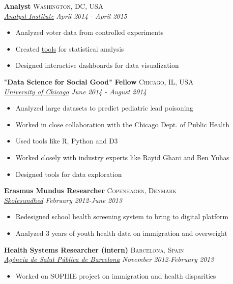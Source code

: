 \documentclass[11pt]{article}
\begin{document}
{\noindent \textbf{Analyst} \hfill \textsc{Washington, DC, USA}\\
\noindent \emph{\href{https://analystinstitute.org/}{Analyst Institute}} \hfill \emph{April 2014 - April 2015}
\vspace{-2mm}
\begin{itemize}\itemsep0pt \parskip0pt 
\item Analyzed voter data from controlled experiments
\item Created \href{https://analystinstitute.org/power-calculator/}{tools} for statistical analysis 
\item Designed interactive dashboards for data visualization
\end{itemize}


\noindent \textbf{"Data Science for Social Good" Fellow} \hfill \textsc{Chicago, IL, USA}\\
\noindent \emph{\href{http://www.uchicago.edu/}{University of Chicago}} \hfill \emph{June 2014 - August 2014}
\vspace{-2mm}
\begin{itemize}\itemsep0pt \parskip0pt 
\item Analyzed large datasets to predict pediatric lead poisoning
\item Worked in close collaboration with the Chicago Dept. of Public Health
\item Used tools like R, Python and D3
\item Worked closely with industry experts like Rayid Ghani and Ben Yuhas
\item Designed tools for data exploration
\end{itemize}


\noindent \textbf{Erasmus Mundus Researcher} \hfill \textsc{Copenhagen, Denmark}\\
\noindent \emph{\href{https://www.skolesundhed.dk/Default.aspx}{Skolesundhed}} \hfill \emph{February 2012-June 2013}
\vspace{-2mm}
\begin{itemize}\itemsep0pt \parskip0pt 
\item Redesigned school health screening system to bring to digital platform 
\item Analyzed 3 years of youth health data on immigration and overweight
\end{itemize}

\noindent \textbf{Health Systems Researcher (intern)} \hfill \textsc{Barcelona, Spain}\\
\noindent \emph{\href{http://www.aspb.cat/}{Agència de Salut Pública de Barcelona}} \hfill \emph{November 2012-February 2013}
\vspace{-2mm}
\begin{itemize}\itemsep0pt \parskip0pt 
\item Worked on SOPHIE project on immigration and health disparities 
\end{itemize}

}
\end{document}
